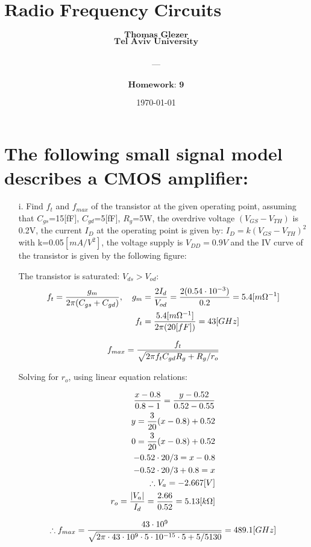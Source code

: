 \documentclass[12pt, letterpaper]{article}
\title{
  \Large $\textbf{Radio Frequency Circuits \& Antenna}$
}
\author{
  $\textbf{Thomas Glezer}$\\
  $\textbf{Tel Aviv University}$\\\\
  ---\\\\
  $\textbf{Homework: 9}$\\
}
\date{\today}
\begin{document}
\begin{titlingpage}
  \maketitle
\end{titlingpage}

\section{The following small signal model describes a CMOS amplifier:}

\begin{itemize}
  \item [i.] Find $f_t$ and $f_{max}$ of the transistor at the given operating point, assuming that $C_{gs}$=15[fF], $C_{gd}$=5[fF], $R_g$=5W, the overdrive voltage $(V_{GS}-V_{TH})$ is 0.2V, the current $I_D$ at the operating point is given by: $I_D = k(V_{GS}-V_{TH})^2$ with k=0.05$[mA/V^2]$, the voltage supply is $V_{DD}=0.9V$ and the IV curve of the transistor is given by the following figure:

  {\color{blue}The transistor is saturated: $V_{ds}>V_{od}$:}
  \begin{align}
    f_t={g_m\over2\pi(C_{gs}+C_{gd})}, \quad g_m&={2I_d\over V_{od}}={2(0.54\cdot10^{-3})\over0.2}=5.4[m\Omega^{-1}]
    \\
    f_t&={5.4[m\Omega^{-1}]\over2\pi(20[fF])}=43[GHz]
  \end{align}

  \begin{align}
    f_{max}
    =
    {f_t\over\sqrt{2\pi f_tC_{gd}R_g+R_g/r_o}}
  \end{align}

  {\color{blue}Solving for $r_o$, using linear equation relations:}

  \begin{align}
    {x-0.8\over 0.8-1}={y-0.52\over 0.52-0.55}
    \\
    y={3\over20}(x-0.8)+0.52
    \\
    0={3\over20}(x-0.8)+0.52
    \\
    -0.52\cdot20/3=x-0.8
    \\
    -0.52\cdot20/3+0.8=x
    \\
    \therefore V_a=-2.667[V]
    \\
    r_o={|V_a|\over I_d}={2.66\over 0.52}=5.13[k\Omega]
  \end{align}

  \begin{align}
    \therefore
    f_{max}={43\cdot10^9\over\sqrt{2\pi\cdot43\cdot10^9\cdot5\cdot10^{-15}\cdot5+5/5130}}=489.1[GHz]
  \end{align}


\end{itemize}
\end{document}
